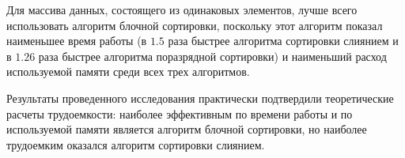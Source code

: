 Для массива данных, состоящего из одинаковых элементов, лучше всего использовать алгоритм блочной сортировки, поскольку этот алгоритм показал наименьшее время работы (в $1.5$ раза быстрее алгоритма сортировки слиянием и в $1.26$ раза быстрее алгоритма поразрядной сортировки) и наименьший расход используемой памяти среди всех трех алгоритмов.

Результаты проведенного исследования практически подтвердили теоретические расчеты трудоемкости: наиболее эффективным по времени работы и по используемой памяти является алгоритм блочной сортировки, но наиболее трудоемким оказался алгоритм сортировки слиянием.

